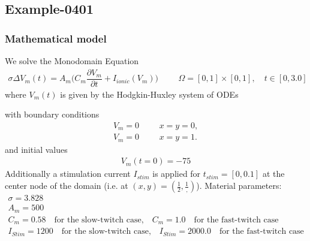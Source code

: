 %
\clearpage
%
\subsection{Example-0401}
%
%
\subsubsection{Mathematical model}
%
We solve the Monodomain Equation
%
\begin{align}
    \sigma \Delta V_m(t) = A_m\Big(C_m \dfrac{\partial V_m}{\partial t} + I_{ionic}(V_m)\Big) & &&\Omega = [0, 1] \times [0, 1], \quad t \in [0, 3.0]
\end{align}
%
where $V_m(t)$ is given by the Hodgkin-Huxley system of ODEs

with boundary conditions
%
\begin{align}
    V_m = 0 & &&x = y = 0, \\
    V_m = 0 & &&x = y = 1.
\end{align}
and initial values 
%
\begin{equation*}
  \begin{array}{lll}
    V_m(t=0) = -75
  \end{array}
\end{equation*}
%
Additionally a stimulation current $I_{stim}$ is applied for $t_{stim} = [0, 0.1]$ at the center node of the domain (i.e. at $(x,y) = (\frac12, \frac1,)$).
%
Material parameters:
\begin{equation*}
  \begin{array}{lll}
    \sigma = 3.828\\[4mm]
    A_m = 500\\[4mm]
    C_m = 0.58 \quad \text{for the slow-twitch case,} \quad C_m = 1.0 \quad \text{for the fast-twitch case}\\[4mm]
    I_{Stim} = 1200 \quad \text{for the slow-twitch case,} \quad I_{Stim} = 2000.0 \quad \text{for the fast-twitch case}\\[4mm]    
  \end{array}
\end{equation*}
%
%
